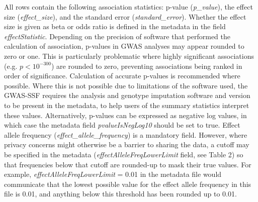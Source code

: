 \documentclass[11pt]{article}
\begin{document}
All rows contain the following association statistics: p-value (\textit{p\_value}), the effect size (\textit{effect\_size}), and the standard error (\textit{standard\_error}). Whether the effect size is given as beta or odds ratio is defined in the metadata in the field \textit{effectStatistic}. Depending on the precision of software that performed the calculation of association, p-values in GWAS analyses may appear rounded to zero or one. This is particularly problematic where highly significant associations (e.g. $p < 10^{-300}$) are rounded to zero, preventing associations being ranked in order of significance. Calculation of accurate p-values is recommended where possible. Where this is not possible due to limitations of the software used, the GWAS-SSF requires the analysis and genotype imputation software and version to be present in the metadata, to help users of the summary statistics interpret these values. Alternatively, p-values can be expressed as negative log values, in which case the metadata field \textit{pvalueIsNegLog10} should be set to true. Effect allele frequency (\textit{effect\_allele\_frequency}) is a mandatory field. However, where privacy concerns might otherwise be a barrier to sharing the data, a cutoff may be specified in the metadata (\textit{effectAlleleFreqLowerLimit} field, see Table 2) so that frequencies below that cutoff are rounded-up to mask their true values. For example, \textit{effectAlleleFreqLowerLimit} = 0.01 in the metadata file would communicate that the lowest possible value for the effect allele frequency in this file is 0.01, and anything below this threshold has been rounded up to 0.01.
\end{document}
